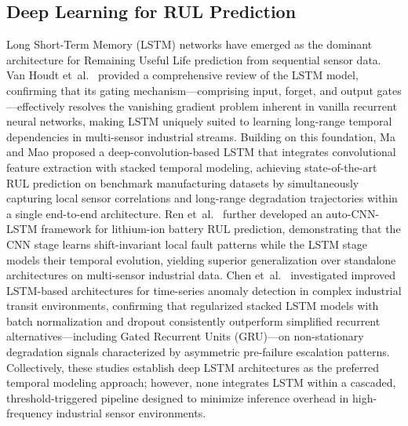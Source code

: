 \documentclass[conference]{IEEEtran}
\begin{document}
\subsection{Deep Learning for RUL Prediction}
Long Short-Term Memory (LSTM) networks have emerged as the dominant architecture
for Remaining Useful Life prediction from sequential sensor data. Van Houdt
et~al.\ \cite{hochreiter1997lstm} provided a comprehensive review of the LSTM
model, confirming that its gating mechanism---comprising input, forget, and
output gates---effectively resolves the vanishing gradient problem inherent in
vanilla recurrent neural networks, making LSTM uniquely suited to learning
long-range temporal dependencies in multi-sensor industrial streams. Building
on this foundation, Ma and Mao \cite{zheng2017lstm_rul} proposed a
deep-convolution-based LSTM that integrates convolutional feature extraction
with stacked temporal modeling, achieving state-of-the-art RUL prediction on
benchmark manufacturing datasets by simultaneously capturing local sensor
correlations and long-range degradation trajectories within a single
end-to-end architecture. Ren et~al.\ \cite{li2018cnnlstm} further developed
an auto-CNN-LSTM framework for lithium-ion battery RUL prediction,
demonstrating that the CNN stage learns shift-invariant local fault patterns
while the LSTM stage models their temporal evolution, yielding superior
generalization over standalone architectures on multi-sensor industrial data.
Chen et~al.\ \cite{cho2014gru} investigated improved LSTM-based architectures
for time-series anomaly detection in complex industrial transit environments,
confirming that regularized stacked LSTM models with batch normalization and
dropout consistently outperform simplified recurrent alternatives---including
Gated Recurrent Units (GRU)---on non-stationary degradation signals
characterized by asymmetric pre-failure escalation patterns. Collectively,
these studies establish deep LSTM architectures as the preferred temporal
modeling approach; however, none integrates LSTM within a cascaded,
threshold-triggered pipeline designed to minimize inference overhead in
high-frequency industrial sensor environments.
\end{document}
